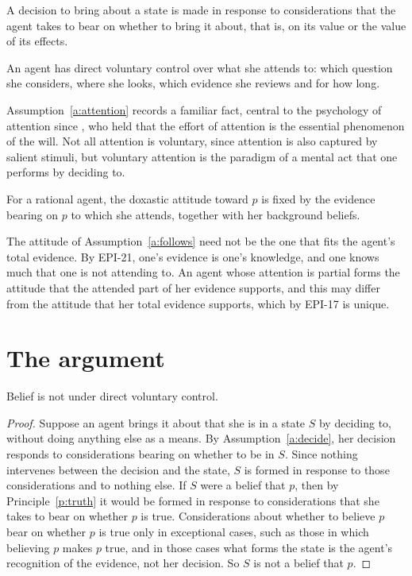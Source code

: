 \documentclass{situationist-preprint}
\begin{document}
\begin{assumption}\label{a:decide}
A decision to bring about a state is made in response to considerations that the agent takes to bear on whether to bring it about, that is, on its value or the value of its effects.
\end{assumption}

\begin{assumption}\label{a:attention}
An agent has direct voluntary control over what she attends to: which question she considers, where she looks, which evidence she reviews and for how long.
\end{assumption}

Assumption~\ref{a:attention} records a familiar fact, central to the psychology of attention since \citet[ch.~XI]{James1890}, who held that the effort of attention is the essential phenomenon of the will. Not all attention is voluntary, since attention is also captured by salient stimuli, but voluntary attention is the paradigm of a mental act that one performs by deciding to.

\begin{assumption}\label{a:follows}
For a rational agent, the doxastic attitude toward $p$ is fixed by the evidence bearing on $p$ to which she attends, together with her background beliefs.
\end{assumption}

The attitude of Assumption~\ref{a:follows} need not be the one that fits the agent's total evidence. By EPI-21, one's evidence is one's knowledge, and one knows much that one is not attending to. An agent whose attention is partial forms the attitude that the attended part of her evidence supports, and this may differ from the attitude that her total evidence supports, which by EPI-17 is unique.

\section{The argument}

\begin{theorem}[Involuntarism]\label{t:invol}
Belief is not under direct voluntary control.
\end{theorem}

\begin{proof}
Suppose an agent brings it about that she is in a state $S$ by deciding to, without doing anything else as a means. By Assumption~\ref{a:decide}, her decision responds to considerations bearing on whether to be in $S$. Since nothing intervenes between the decision and the state, $S$ is formed in response to those considerations and to nothing else. If $S$ were a belief that $p$, then by Principle~\ref{p:truth} it would be formed in response to considerations that she takes to bear on whether $p$ is true. Considerations about whether to believe $p$ bear on whether $p$ is true only in exceptional cases, such as those in which believing $p$ makes $p$ true, and in those cases what forms the state is the agent's recognition of the evidence, not her decision. So $S$ is not a belief that $p$.
\end{proof}
\end{document}
